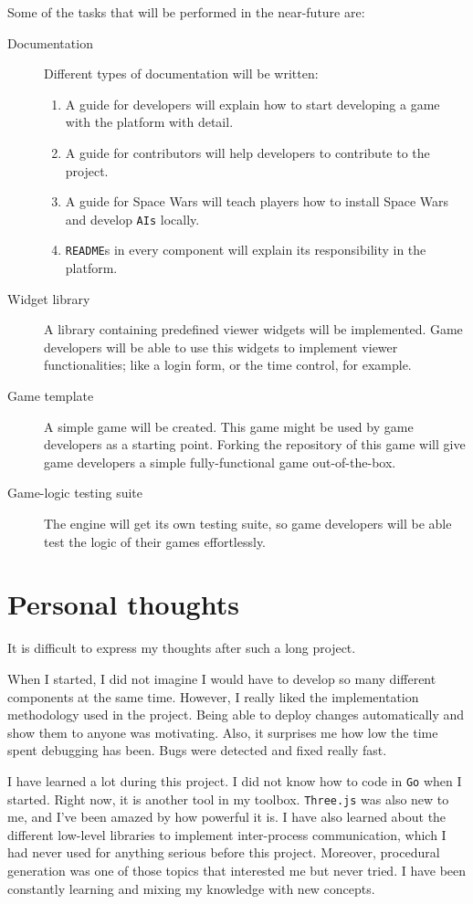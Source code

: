 \documentclass[a4paper,11pt,titlepage,abstract,numbers=noenddot,automark,mnsy,intlimits,rgb,dvipsnames]{report}
\begin{document}
Some of the tasks that will be performed in the near-future are:
\begin{description}
\item[Documentation]
Different types of documentation will be written:
\begin{enumerate}
\item
A guide for developers will explain how to start developing a game with the platform with detail.
\item
A guide for contributors will help developers to contribute to the project.
\item
A guide for Space Wars will teach players how to install Space Wars and develop \texttt{AIs} locally.
\item
\texttt{README}s in every component will explain its responsibility in the platform.
\end{enumerate}
\item[Widget library]
A library containing predefined viewer widgets will be implemented. Game developers will be
  able to use this widgets to implement viewer functionalities; like a login form, or the time control, for example.
\item[Game template]
A simple game will be created. This game might be used by game developers as a starting point.
  Forking the repository of this game will give game developers a simple fully-functional game out-of-the-box.
\item[Game-logic testing suite]
The engine will get its own testing suite, so game developers will be able test the logic
  of their games effortlessly.
\end{description}
\section{Personal thoughts}
It is difficult to express my thoughts after such a long project.

When I started, I did not imagine I would have to develop so many different components at the same time. However, I really
liked the implementation methodology used in the project. Being able to deploy changes automatically and show them
to anyone was motivating. Also, it surprises me how low the time spent debugging has been. Bugs were detected
and fixed really fast.

I have learned a lot during this project. I did not know how to code in \texttt{Go} when I started. Right now, it is
another tool in my toolbox. \texttt{Three.js} was also new to me, and I've been amazed by how powerful it is. I have also learned about 
the different low-level libraries to implement inter-process communication, which I had never used for anything serious
before this project. Moreover, procedural generation was one of those topics that interested me but never tried.
I have been constantly learning and mixing my knowledge with new concepts.
\end{document}
